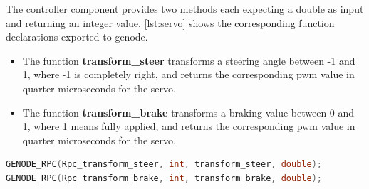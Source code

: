 The controller component provides two methods each expecting a double as input and returning an integer value.
\autoref{lst:servo} shows the corresponding function declarations exported to genode.
\begin{itemize}
\item The function \textbf{transform\_steer} transforms a steering angle between -1 and 1, where -1 is completely right, and returns the corresponding pwm value in quarter microseconds for the servo.
\item The function \textbf{transform\_brake} transforms a braking value between 0 and 1, where 1 means fully applied, and returns the corresponding pwm value in quarter microseconds for the servo.
\end{itemize}

\begin{lstlisting}[language=c, frame=single, basicstyle=\footnotesize,  label={lst:controller}, caption=Genode interface for controller component]
GENODE_RPC(Rpc_transform_steer, int, transform_steer, double);
GENODE_RPC(Rpc_transform_brake, int, transform_brake, double);
\end{lstlisting}
